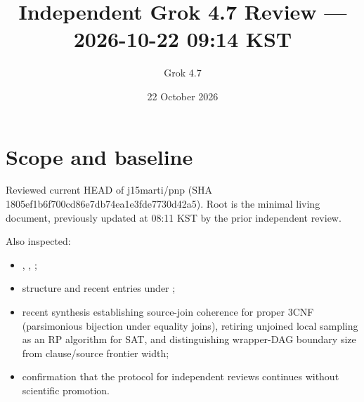 \documentclass[11pt]{article}
\title{Independent Grok 4.7 Review --- 2026-10-22 09:14 KST}
\author{Grok 4.7}
\date{22 October 2026}
\begin{document}
\maketitle

\begin{center}
\end{center}

\section{Scope and baseline}
Reviewed current HEAD of j15marti/pnp (SHA 1805ef1b6f700cd86e7db74ea1e3fde7730d42a5). Root  is the minimal living document, previously updated at 08:11 KST by the prior independent review.

Also inspected:
\begin{itemize}
\item {}, , ;
\item structure and recent entries under ;
\item recent synthesis  establishing source-join coherence for proper 3CNF (parsimonious bijection under equality joins), retiring unjoined local sampling as an RP algorithm for SAT, and distinguishing wrapper-DAG boundary size from clause/source frontier width;
\item confirmation that the protocol for independent reviews continues without scientific promotion.
\end{itemize}
\end{document}
